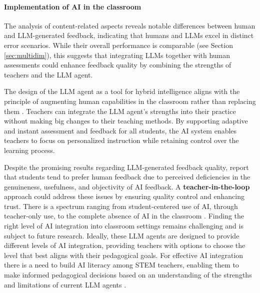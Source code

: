 
\paragraph{Implementation of AI in the classroom}

The analysis of content-related aspects reveals notable differences between human and LLM-generated feedback, indicating that humans and LLMs excel in distinct error scenarios. While their overall performance is comparable (see Section \ref{sec:multidim}), this suggests that integrating LLMs together with human assessments could enhance feedback quality by combining the strengths of teachers and the LLM agent.
%

The design of the LLM agent as a tool for hybrid intelligence aligns with the principle of augmenting human capabilities in the classroom rather than replacing them \citep{molenaar2022towards}. Teachers can integrate the LLM agent's strengths into their practice without making big changes to their teaching methods. By supporting adaptive and instant assessment and feedback for all students, the AI system enables teachers to focus on personalized instruction while retaining control over the learning process.

%
Despite the promising results regarding LLM-generated feedback quality, \citet{nazaretsky2024ai} report that students tend to prefer human feedback due to perceived deficiencies in the genuineness, usefulness, and objectivity of AI feedback. A \textbf{teacher-in-the-loop} approach could address these issues by ensuring quality control and enhancing trust. There is a spectrum ranging from student-centered use of AI, through teacher-only use, to the complete absence of AI in the classroom \citep{molenaar2022towards}. Finding the right level of AI integration into classroom settings remains challenging and is subject to future research. Ideally, these LLM agents are designed to provide different levels of AI integration, providing teachers with options to choose the level that best aligns with their pedagogical goals. For effective AI integration there is a need to build AI literacy among STEM teachers, enabling them to make informed pedagogical decisions based on an understanding of the strengths and limitations of current LLM agents \citep{hornberger2023university}.



